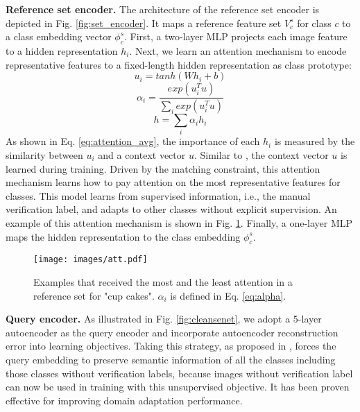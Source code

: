 \documentclass[10pt,twocolumn,letterpaper]{article}
\begin{document}
\noindent
\textbf{Reference set encoder.} The architecture of the reference set encoder is depicted in Fig. \ref{fig:set_encoder}. It maps a reference feature set $V_c^s$ for class $c$ to a class embedding vector $\phi_c^s$. First, a two-layer MLP projects each image feature to a hidden representation $h_i$. Next, we learn an attention mechanism to encode representative features to a fixed-length hidden representation as class prototype:
\begin{equation}
u_i = tanh(Wh_i + b)
\end{equation}
\begin{equation}
\alpha_i = \dfrac{exp(u_i^Tu)}{\sum_iexp(u_i^Tu)}
\label{eq:alpha}
\end{equation}
\begin{equation}
h = \sum_i\alpha_ih_i
\label{eq:attention_avg}
\end{equation}
As shown in Eq. \eqref{eq:attention_avg}, the importance of each $h_i$ is measured by the similarity between $u_i$ and a context vector $u$. Similar to \cite{yang2016hierarchical}, the context vector $u$ is learned during training. Driven by the matching constraint, this attention mechanism learns how to pay attention on the most representative features for classes. This model learns from supervised information, i.e., the manual verification label, and adapts to other classes without explicit supervision. An example of this attention mechanism is shown in Fig. \ref{fig:att}. Finally, a one-layer MLP maps the hidden representation to the class embedding $\phi_c^s$.


\begin{figure}[t]
\begin{center}
\texttt{[image: images/att.pdf]}
\end{center}
\vspace{-3mm}
\caption{Examples that received the most and the least attention in a reference set for "cup cakes". $\alpha_i$ is defined in Eq. \eqref{eq:alpha}. }
\label{fig:att}
\end{figure}

\noindent
\textbf{Query encoder.} As illustrated in Fig. \ref{fig:cleansenet}, we adopt a 5-layer autoencoder \cite{hinton2006reducing} as the query encoder and incorporate autoencoder reconstruction error into learning objectives. Taking this strategy, as proposed in \cite{tsai2017learning}, forces the query embedding to preserve semantic information of all the classes including those classes without verification labels, because images without verification label can now be used in training with this unsupervised objective. It has been proven effective for improving domain adaptation performance.
\end{document}
